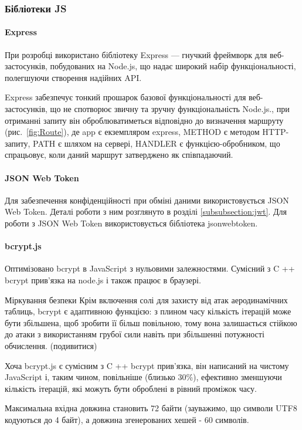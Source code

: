 \subsubsection{Бібліотеки JS}

\paragraph{Express}

При розробці використано бібліотеку Express — гнучкий фреймворк для веб-застосунків, побудованих на Node.js, що надає широкий набір функціональності, полегшуючи створення надійних API.

Express забезпечує тонкий прошарок базової функціональності для веб-застосунків, що не спотворює звичну та зручну функціональність Node.js., при отриманні запиту він оброблюватиметься відповідно до визначення маршруту (рис.~\ref{fig:Route}), де app є екземпляром express, METHOD є методом HTTP-запиту, PATH є шляхом на сервері, HANDLER є функцією-обробником, що спрацьовує, коли даний маршрут затверджено як співпадаючий.

\paragraph{JSON Web Token}

Для забезпечення конфіденційності при обміні даними використовується JSON Web Token. Деталі роботи з ним розглянуто в розділі \ref{subsubsection:jwt}. Для роботи з JSON Web Token використовується бібліотека jsonwebtoken.

\paragraph{bcrypt.js}

Оптимізовано bcrypt в JavaScript з нульовими залежностями. Сумісний з C ++ bcrypt прив'язка на node.js і також працює в браузері.

Міркування безпеки
Крім включення солі для захисту від атак аеродинамічних таблиць, bcrypt є адаптивною функцією: з плином часу кількість ітерацій може бути збільшена, щоб зробити її більш повільною, тому вона залишається стійкою до атаки з використанням грубої сили навіть при збільшенні потужності обчислення. (подивитися)

Хоча bcrypt.js є сумісним з C ++ bcrypt прив'язка, він написаний на чистому JavaScript і, таким чином, повільніше (близько 30\%), ефективно зменшуючи кількість ітерацій, які можуть бути оброблені в рівний проміжок часу.

Максимальна вхідна довжина становить 72 байти (зауважимо, що символи UTF8 кодуються до 4 байт), а довжина згенерованих хешей - 60 символів.
